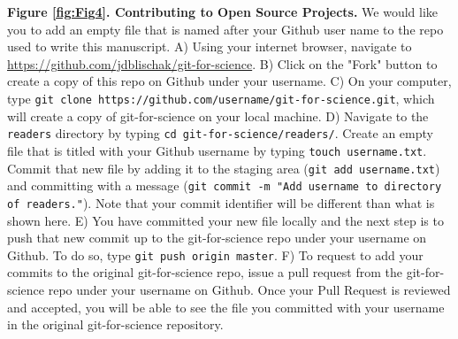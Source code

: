 \textbf{Figure \ref{fig:Fig4}. Contributing to Open Source Projects.}
We would like you to add an empty file that is named after your Github user name to the repo used to write this manuscript. 
A) Using your internet browser, navigate to \href{https://github.com/jdblischak/git-for-science}{https://github.com/jdblischak/git-for-science}. 
B) Click on the "Fork" button to create a copy of this repo on Github under your username. 
C) On your computer, type \verb|git clone https://github.com/username/git-for-science.git|, which will create a copy of git-for-science on your local machine.
D) Navigate to the \verb|readers| directory by typing \verb|cd git-for-science/readers/|. 
Create an empty file that is titled with your Github username by typing \verb|touch username.txt|. 
Commit that new file by adding it to the staging area (\verb|git add username.txt|) and committing with a message (\verb|git commit -m "Add username to directory of readers."|). 
Note that your commit identifier will be different than what is shown here.
E) You have committed your new file locally and the next step is to push that new commit up to the git-for-science repo under your username on Github. 
To do so, type \verb|git push origin master|. 
F) To request to add your commits to the original git-for-science repo, issue a pull request from the git-for-science repo under your username on Github. 
Once your Pull Request is reviewed and accepted, you will be able to see the file you committed with your username in the original git-for-science repository.

  
  
  
  
  